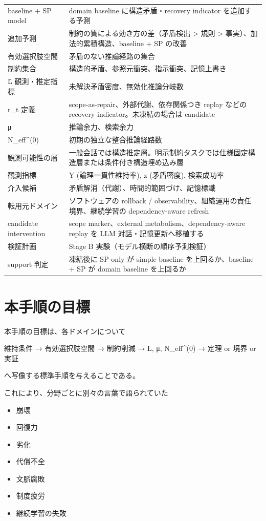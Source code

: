 \documentclass[12pt,a4paper]{article}
\begin{document}
{\begin{longtable}[]{@{}
  >{\raggedright\arraybackslash}p{}
  >{\raggedright\arraybackslash}p{}@{}}
baseline + SP model & domain baseline に構造矛盾・recovery indicator を追加する予測 \\
追加予測 & 制約の質による効き方の差（矛盾検出 \textgreater{} 規則 \textgreater{} 事実）、加法的累積構造、baseline + SP の改善 \\
有効選択肢空間 & 矛盾のない推論経路の集合 \\
制約集合 & 構造的矛盾、参照元衝突、指示衝突、記憶上書き \\
L̂ 観測・推定指標 & 未解決矛盾密度、無効化推論分岐数 \\
r\_t 定義 & scope-as-repair、外部代謝、依存関係つき replay などの recovery indicator。未凍結の場合は candidate \\
μ & 推論余力、検索余力 \\
N\_eff\^{}(0) & 初期の独立な整合推論経路数 \\
観測可能性の層 & 一般会話では構造推定層。明示制約タスクでは仕様固定構造層または条件付き構造埋め込み層 \\
観測指標 & Y (論理一貫性維持率), z (矛盾密度), 検索成功率 \\
介入候補 & 矛盾解消（代謝）、時間的範囲づけ、記憶標識 \\
転用元ドメイン & ソフトウェアの rollback / observability、組織運用の責任境界、継続学習の dependency-aware refresh \\
candidate intervention & scope marker、external metabolism、dependency-aware replay を LLM 対話・記憶更新へ移植する \\
検証計画 & Stage B 実験（モデル横断の順序予測検証） \\
support 判定 & 凍結後に SP-only が simple baseline を上回るか、baseline + SP が domain baseline を上回るか \\
\end{longtable}
}

\section{本手順の目標}\label{ux672cux624bux9806ux306eux76eeux6a19}

本手順の目標は、各ドメインについて

維持条件 → 有効選択肢空間 → 制約削減 → L, μ, N\_eff\^{}(0) → 定理 or 境界 or 実証

へ写像する標準手順を与えることである。

これにより、分野ごとに別々の言葉で語られていた

\begin{itemize}
\tightlist
\item
  崩壊
\item
  回復力
\item
  劣化
\item
  代償不全
\item
  文脈腐敗
\item
  制度疲労
\item
  継続学習の失敗
\end{itemize}
\end{document}
